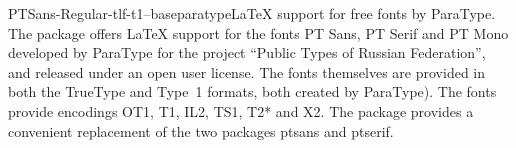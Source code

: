 \documentclass{ddltxtyp}
\begin{document}
\begin{package}{PTSans-Regular-tlf-t1--base}{paratype}{{\LaTeX} support for free fonts by ParaType.}
The package offers {\LaTeX} support for the fonts PT Sans, PT
Serif and PT Mono developed by ParaType for the project ``Public
Types of Russian Federation'', and released under an open user
license. The fonts themselves are provided in both the TrueType
and Type~1 formats, both created by ParaType). The fonts
provide encodings OT1, T1, IL2, TS1, T2* and X2. The package
provides a convenient replacement of the two packages ptsans
and ptserif.
\end{package}
\end{document}
